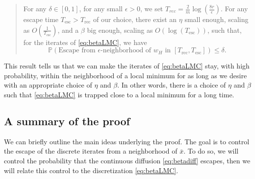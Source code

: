 \documentclass[11pt,twoside]{article}
\theoremstyle{definition}
\newcommand{\Prb}{\mathbb{P}}
\begin{document}
\begin{quote}
\begin{emph}
For any $\delta \in [0, 1]$, for any small $\epsilon >0$, we set $T_{rec} = \frac{2}{m} \log(\frac{8r}{\epsilon})$. For any escape time $T_{\text{esc}} > T_{\text{rec}}$ of our choice, there exist an $\eta$ small enough, scaling as $O(\frac{1}{T_{\text{esc}}})$, and a $\beta$ big enough, scaling as $O(\log(T_{\text{esc}}))$, such that, for the iterates of \eqref{eq:betaLMC}, we have
\[
\Prb(\text{Escape from $\epsilon$-neighborhood of $w_H$ in } [T_{\text{rec}}, T_{\text{esc}}]) \leq \delta.
\]
\end{emph}
\end{quote}

This result tells us that we can make the iterates of \eqref{eq:betaLMC} stay, with high probability, within the neighborhood of a local minimum for as long as we desire with an appropriate choice of $\eta$ and $\beta$. In other words, there is a choice of $\eta$ and $\beta$ such that \eqref{eq:betaLMC} is trapped close to a local minimum for a long time.

\subsection{A summary of the proof}

We can briefly outline the main ideas underlying the proof. The goal is to control the escape of the discrete iterates from a neighborhood of $\bar{x}$. To do so, we will control the probability that the continuous diffusion \eqref{eq:betadiff} escapes, then we will relate this control to the discretization \eqref{eq:betaLMC}.
\end{document}

